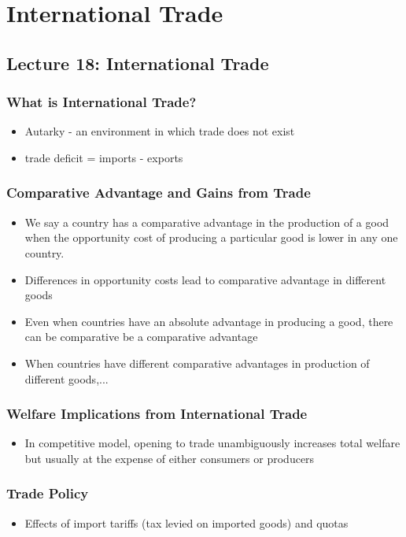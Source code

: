 \documentclass{article}
\begin{document}
\section{International Trade}
\subsection{Lecture 18: International Trade}
\subsubsection{What is International Trade?}
\begin{itemize}
\item Autarky - an environment in which trade does not exist
\item trade deficit = imports - exports
\end{itemize}

\subsubsection{Comparative Advantage and Gains from Trade}
\begin{itemize}
\item We say a country has a comparative advantage in the production of a good when the opportunity cost of producing a particular good is lower in any one country.
\item Differences in opportunity costs lead to comparative advantage in different goods
\item Even when countries have an absolute advantage in producing a good, there can be comparative be a comparative advantage
\item When countries have different comparative advantages in production of different goods,...
\end{itemize}

\subsubsection{Welfare Implications from International Trade}
\begin{itemize}
\item In competitive model, opening to trade unambiguously increases total welfare but usually at the expense of either consumers or producers
\end{itemize}

\subsubsection{Trade Policy}
\begin{itemize}
\item Effects of import tariffs (tax levied on imported goods) and quotas
\end{itemize}
\end{document}
